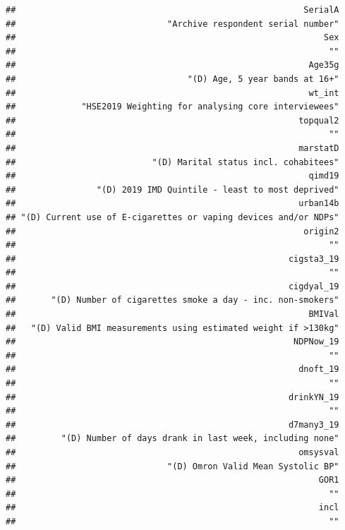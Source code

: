 \documentclass[
  11pt,
]{article}
\begin{document}
\begin{verbatim}
##                                                         SerialA 
##                              "Archive respondent serial number" 
##                                                             Sex 
##                                                              "" 
##                                                          Age35g 
##                                  "(D) Age, 5 year bands at 16+" 
##                                                          wt_int 
##             "HSE2019 Weighting for analysing core interviewees" 
##                                                        topqual2 
##                                                              "" 
##                                                        marstatD 
##                           "(D) Marital status incl. cohabitees" 
##                                                          qimd19 
##                "(D) 2019 IMD Quintile - least to most deprived" 
##                                                        urban14b 
## "(D) Current use of E-cigarettes or vaping devices and/or NDPs" 
##                                                         origin2 
##                                                              "" 
##                                                      cigsta3_19 
##                                                              "" 
##                                                      cigdyal_19 
##       "(D) Number of cigarettes smoke a day - inc. non-smokers" 
##                                                          BMIVal 
##   "(D) Valid BMI measurements using estimated weight if >130kg" 
##                                                       NDPNow_19 
##                                                              "" 
##                                                        dnoft_19 
##                                                              "" 
##                                                      drinkYN_19 
##                                                              "" 
##                                                      d7many3_19 
##         "(D) Number of days drank in last week, including none" 
##                                                        omsysval 
##                              "(D) Omron Valid Mean Systolic BP" 
##                                                            GOR1 
##                                                              "" 
##                                                            incl 
##                                                              ""
\end{verbatim}
\end{document}

